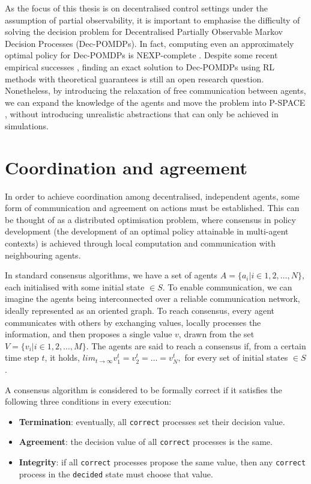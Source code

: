 \documentclass[a4paper,singleside,12pt]{report} %
\begin{document}
As the focus of this thesis is on decentralised control settings under the assumption of partial observability, it is important to emphasise the difficulty of solving the decision problem for Decentralised Partially Observable Markov Decision Processes (Dec-POMDPs). In fact, computing even an approximately optimal policy for Dec-POMDPs is NEXP-complete \cite{Bernstein2000TheCO, Rabinovich2003TheCO}. Despite some recent empirical successes \cite{Leibo2017MultiagentRL, Foerster2016LearningTC}, finding an exact solution to Dec-POMDPs using RL methods with theoretical guarantees is still an open research question. Nonetheless, by introducing the relaxation of free communication between agents, we can expand the knowledge of the agents and move the problem into P-SPACE \cite{Blondel2000ASO}, without introducing unrealistic abstractions that can only be achieved in simulations.

\section{Coordination and agreement}\label{coordination-and-agreement}
In order to achieve coordination among decentralised, independent agents, some form of communication and agreement on actions must be established. This can be thought of as a distributed optimisation problem, where consensus in policy development (the development of an optimal policy attainable in multi-agent contexts) is achieved through local computation and communication with neighbouring agents.

In standard consensus algorithms, we have a set of agents $A=\{a_i | i \in 1, 2, \dots, N\}$, each initialised with some initial state $\in S$. To enable communication, we can imagine the agents being interconnected over a reliable communication network, ideally represented as an oriented graph. To reach consensus, every agent communicates with others by exchanging values, locally processes the information, and then proposes a single value $v$, drawn from the set $V=\{v_i | i \in 1,2, \dots, M\}$. The agents are said to reach a consensus if, from a certain time step \(t\), it holds, $lim_{t \to \infty} v_1^t = v_2^t = \dots = v_N^t,$ for every set of initial states $\in S$.

A consensus algorithm is considered to be formally correct \cite{Coulouris2012DistributedS} if it satisfies the following three conditions in every execution:

\begin{itemize}
\item \textbf{Termination}: eventually, all \texttt{correct} processes set their decision value.
\item \textbf{Agreement}: the decision value of all \texttt{correct} processes is the same.
\item \textbf{Integrity}: if all \texttt{correct} processes propose the same value, then any \texttt{correct} process in the \texttt{decided} state must choose that value.
\end{itemize}
\end{document}
